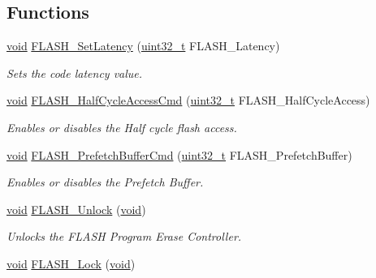 \subsection*{Functions}
\begin{DoxyCompactItemize}
\item 
\hyperlink{usb__devapi_8h_afabf60e7f57651d6d595a02c75f07cd0}{void} \hyperlink{group___f_l_a_s_h___exported___functions_ga54bcb96270215c752c3479c8c9e438c0}{F\+L\+A\+S\+H\+\_\+\+Set\+Latency} (\hyperlink{_p_e___types_8h_a33594304e786b158f3fb30289278f5af}{uint32\+\_\+t} F\+L\+A\+S\+H\+\_\+\+Latency)
\begin{DoxyCompactList}\small\item\em Sets the code latency value. \end{DoxyCompactList}\item 
\hyperlink{usb__devapi_8h_afabf60e7f57651d6d595a02c75f07cd0}{void} \hyperlink{group___f_l_a_s_h___exported___functions_ga978103a57b37920ac01128e999f9ece6}{F\+L\+A\+S\+H\+\_\+\+Half\+Cycle\+Access\+Cmd} (\hyperlink{_p_e___types_8h_a33594304e786b158f3fb30289278f5af}{uint32\+\_\+t} F\+L\+A\+S\+H\+\_\+\+Half\+Cycle\+Access)
\begin{DoxyCompactList}\small\item\em Enables or disables the Half cycle flash access. \end{DoxyCompactList}\item 
\hyperlink{usb__devapi_8h_afabf60e7f57651d6d595a02c75f07cd0}{void} \hyperlink{group___f_l_a_s_h___exported___functions_ga6b93faaf0f560bf8d662b2cefe2f70e8}{F\+L\+A\+S\+H\+\_\+\+Prefetch\+Buffer\+Cmd} (\hyperlink{_p_e___types_8h_a33594304e786b158f3fb30289278f5af}{uint32\+\_\+t} F\+L\+A\+S\+H\+\_\+\+Prefetch\+Buffer)
\begin{DoxyCompactList}\small\item\em Enables or disables the Prefetch Buffer. \end{DoxyCompactList}\item 
\hyperlink{usb__devapi_8h_afabf60e7f57651d6d595a02c75f07cd0}{void} \hyperlink{group___f_l_a_s_h___exported___functions_ga4084d0184bab463a1579271bf474aaef}{F\+L\+A\+S\+H\+\_\+\+Unlock} (\hyperlink{usb__devapi_8h_afabf60e7f57651d6d595a02c75f07cd0}{void})
\begin{DoxyCompactList}\small\item\em Unlocks the F\+L\+A\+SH Program Erase Controller. \end{DoxyCompactList}\item 
\hyperlink{usb__devapi_8h_afabf60e7f57651d6d595a02c75f07cd0}{void} \hyperlink{group___f_l_a_s_h___exported___functions_ga46899557353c4312ddbe3f25e65df1d8}{F\+L\+A\+S\+H\+\_\+\+Lock} (\hyperlink{usb__devapi_8h_afabf60e7f57651d6d595a02c75f07cd0}{void})

\end{DoxyCompactItemize}
